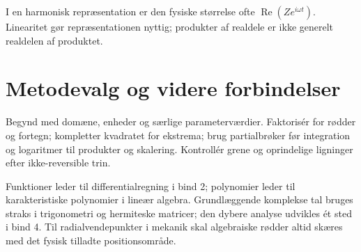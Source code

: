 

\clearpage


I en harmonisk repræsentation er den fysiske størrelse ofte
$\operatorname{Re}(Ze^{i\omega t})$. Linearitet gør repræsentationen nyttig;
produkter af realdele er ikke generelt realdelen af produktet.

\section{Metodevalg og videre forbindelser}
Begynd med domæne, enheder og særlige parameterværdier.
Faktorisér for rødder og fortegn; kompletter kvadratet for ekstrema;
brug partialbrøker før integration og logaritmer til produkter og skalering.
Kontrollér grene og oprindelige ligninger efter ikke-reversible trin.

Funktioner leder til differentialregning i bind 2; polynomier leder til
karakteristiske polynomier i lineær algebra. Grundlæggende komplekse tal
bruges straks i trigonometri og hermiteske matricer; den dybere analyse
udvikles ét sted i bind 4. Til radialvendepunkter i mekanik skal
algebraiske rødder altid skæres med det fysisk tilladte positionsområde.
